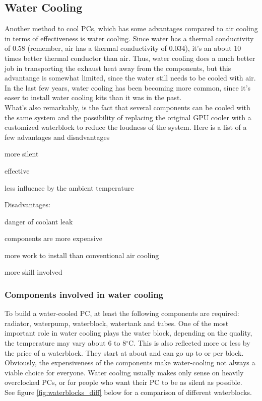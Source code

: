 \subsection{Water Cooling}

Another method to cool PCs, which has some advantages compared to air cooling in terms of effectiveness is water cooling.
Since water has a thermal conductivity of 0.58 (remember, air has a thermal conductivity of 0.034), it's an about 10 times better thermal conductor than air.
Thus, water cooling does a much better job in transporting the exhaust heat away from the components, but this advantange is somewhat limited,
since the water still needs to be cooled with air. In the last few years, water cooling has been becoming more
common, since it's easer to install water cooling kits than it was in the past. \\
What's also remarkably, is the fact that several components can be cooled with the same system and the possibility of replacing the original GPU cooler
with a customized waterblock to reduce the loudness of the system. Here is a list of a few advantages and disadvantages\\
\begin{compactitem}
\item more silent
\item effective
\item less influence by the ambient temperature \\
\end{compactitem}
Disadvantages:
\begin{compactitem}
\item danger of coolant leak
\item components are more expensive
\item more work to install than conventional air cooling
\item more skill involved \\
\end{compactitem}

\subsubsection{Components involved in water cooling}

To build a water-cooled PC, at least the following components are required: radiator, waterpump, waterblock, watertank and tubes. 
One of the most important role in water cooling plays the water block, depending on the quality, the temperature may vary about 6 to 8$^\circ$C.
This is also reflected more or less by the price of a waterblock. They start at about  and can go up to  or  per block.\\
Obviously, the expensiveness of the components make water-cooling not always a viable choice for everyone. Water cooling usually makes only sense on heavily overclocked PCs, or for people who want their PC to be as silent as possible.\\
See figure \ref{fig:waterblocks_diff} below for a comparison of different waterblocks.

